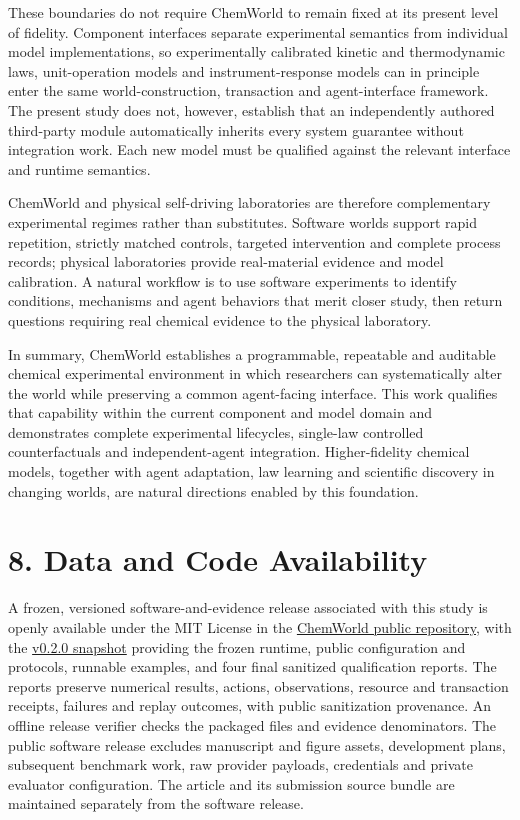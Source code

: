 \documentclass[10pt,twocolumn]{article}
\begin{document}
These boundaries do not require ChemWorld to remain fixed at its present
level of fidelity. Component interfaces separate experimental semantics
from individual model implementations, so experimentally calibrated
kinetic and thermodynamic laws, unit-operation models and
instrument-response models can in principle enter the same
world-construction, transaction and agent-interface framework. The
present study does not, however, establish that an independently
authored third-party module automatically inherits every system
guarantee without integration work. Each new model must be qualified
against the relevant interface and runtime semantics.

ChemWorld and physical self-driving laboratories are therefore
complementary experimental regimes rather than substitutes. Software
worlds support rapid repetition, strictly matched controls, targeted
intervention and complete process records; physical laboratories provide
real-material evidence and model calibration. A natural workflow is to
use software experiments to identify conditions, mechanisms and agent
behaviors that merit closer study, then return questions requiring real
chemical evidence to the physical laboratory.

In summary, ChemWorld establishes a programmable, repeatable and
auditable chemical experimental environment in which researchers can
systematically alter the world while preserving a common agent-facing
interface. This work qualifies that capability within the current
component and model domain and demonstrates complete experimental
lifecycles, single-law controlled counterfactuals and independent-agent
integration. Higher-fidelity chemical models, together with agent
adaptation, law learning and scientific discovery in changing worlds,
are natural directions enabled by this foundation.

\section{8. Data and Code
Availability}\label{data-and-code-availability}

A frozen, versioned software-and-evidence release associated with this
study is openly available under the MIT License in the
\href{https://github.com/sunyrain/ChemWorld-Public}{ChemWorld public
repository}, with the
\href{https://github.com/sunyrain/ChemWorld-Public/tree/v0.2.0}{v0.2.0
snapshot} providing the frozen runtime, public configuration and
protocols, runnable examples, and four final sanitized qualification
reports. The reports preserve numerical results, actions, observations,
resource and transaction receipts, failures and replay outcomes, with
public sanitization provenance. An offline release verifier checks the
packaged files and evidence denominators. The public software release
excludes manuscript and figure assets, development plans, subsequent
benchmark work, raw provider payloads, credentials and private evaluator
configuration. The article and its submission source bundle are
maintained separately from the software release.
\end{document}
